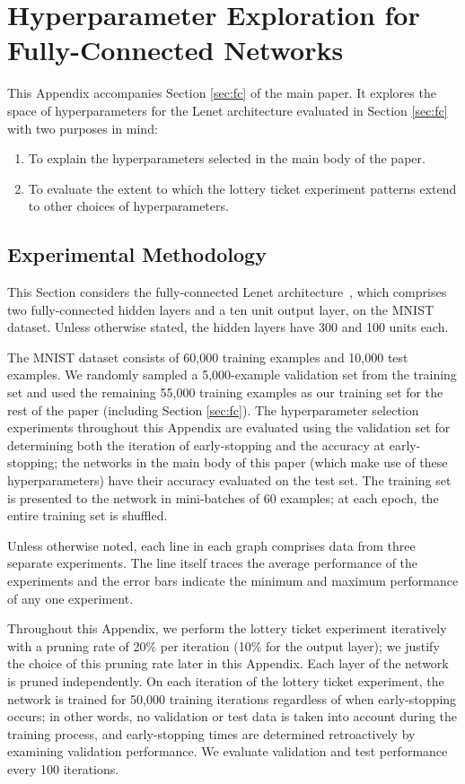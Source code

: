 \section{Hyperparameter Exploration for Fully-Connected Networks}
\label{app:mnist}

This Appendix accompanies Section \ref{sec:fc} of the main paper. It explores the space of hyperparameters for the Lenet
architecture evaluated in Section \ref{sec:fc} with two purposes in mind:

\begin{enumerate}
\item To explain the hyperparameters selected in the main body of the paper.
\item To evaluate the extent to which the lottery ticket experiment patterns extend to other choices of hyperparameters.
\end{enumerate}

\subsection{Experimental Methodology}

This Section considers the fully-connected Lenet architecture~\citep{lenet}, which comprises
two fully-connected hidden layers and a ten unit output layer, on the MNIST dataset. Unless otherwise stated, the hidden layers have 300 and 100 units each.

The MNIST dataset consists of 60,000 training examples and 10,000 test examples. We randomly sampled a 5,000-example validation set from
the training set and used the remaining 55,000 training examples as our training set for the rest of the paper (including Section \ref{sec:fc}). The hyperparameter
 selection experiments throughout this Appendix are evaluated using the validation set for determining both the iteration of early-stopping and
 the accuracy at early-stopping;
 the networks in the
main body of this paper (which make use of these hyperparameters) have their accuracy evaluated on the test set. The training set is presented to the network
in mini-batches of 60 examples; at each epoch, the entire training set is shuffled.

Unless otherwise noted, each line in each graph comprises data from three separate experiments. The line itself traces the average performance
of the experiments and the error bars indicate the minimum and maximum performance of any one experiment.

Throughout this Appendix, we perform the lottery ticket experiment iteratively with a pruning rate
of 20\% per iteration (10\% for the output layer); we justify the choice of this pruning rate later in this Appendix. Each layer of the network is pruned independently.
On each iteration of the lottery
ticket experiment, the network is trained for 50,000 training iterations regardless of when early-stopping occurs; in other words, no validation or test
data is taken into account during the training process, and early-stopping times are determined retroactively by examining validation performance.
We evaluate validation and test performance every 100 iterations.

